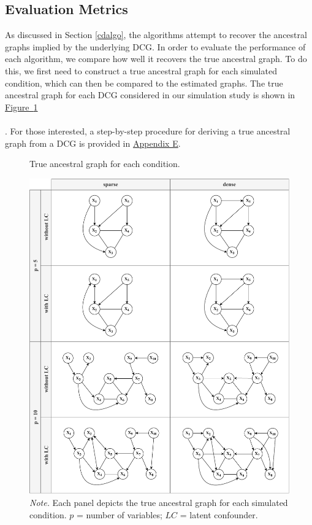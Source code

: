 \documentclass[twoside, 11pt]{article}
\newcommand*{\figref}[2][]{%
  \hyperref[{fig:#2}]{%
    Figure~\ref*{fig:#2}%
    \ifx\\#1\\%
    \else
      #1%
    \fi
  }%
}
\begin{document}
\subsection{Evaluation Metrics} \label{eval}
As discussed in Section \ref{cdalgo}, the algorithms attempt to recover the ancestral graphs implied by the underlying DCG. In order to evaluate the performance of each algorithm, we compare how well it recovers the true ancestral graph. To do this, we first need to construct a true ancestral graph for each simulated condition, which can then be compared to the estimated graphs. The true ancestral graph for each DCG considered in our simulation study is shown in \figref[]{ancgraphs}. For those interested, a step-by-step procedure for deriving a true ancestral graph from a DCG is provided in \hyperref[trueancestral]{Appendix E}.

\begin{figure}[!htbp]
    \centering
        \caption{True ancestral graph for each condition.}
        \vspace{1mm}
        \includegraphics[width=1\textwidth]{figures/Fig12.pdf}
        \caption*{\small{\textit{Note.} Each panel depicts the true ancestral graph for each simulated condition. $p$ = number of variables; $LC$ = latent confounder.}}
    \label{fig:ancgraphs}
\end{figure}
\end{document}
